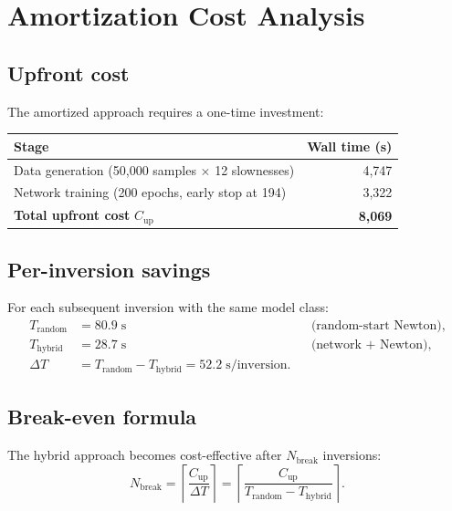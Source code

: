 \documentclass[11pt,a4paper]{article}
\theoremstyle{plain}
\theoremstyle{remark}
\begin{document}
\section{Amortization Cost Analysis}\label{sec:cost}

\subsection{Upfront cost}

The amortized approach requires a one-time investment:

\begin{center}
\renewcommand{\arraystretch}{1.3}
\begin{tabular}{lr}
  \toprule
  \textbf{Stage} & \textbf{Wall time (s)} \\
  \midrule
  Data generation (50{,}000 samples $\times$ 12 slownesses) & 4{,}747 \\
  Network training (200 epochs, early stop at 194) & 3{,}322 \\
  \midrule
  \textbf{Total upfront cost} $C_{\text{up}}$ & \textbf{8{,}069} \\
  \bottomrule
\end{tabular}
\end{center}

\subsection{Per-inversion savings}

For each subsequent inversion with the same model class:
\begin{align}
  T_{\text{random}} &= 80.9\;\text{s} && \text{(random-start Newton)},
  \label{eq:t-random}\\
  T_{\text{hybrid}} &= 28.7\;\text{s} && \text{(network + Newton)},
  \label{eq:t-hybrid}\\
  \Delta T &= T_{\text{random}} - T_{\text{hybrid}}
            = 52.2\;\text{s/inversion}. \label{eq:delta-t}
\end{align}

\subsection{Break-even formula}

The hybrid approach becomes cost-effective after $N_{\text{break}}$
inversions:
\begin{equation}\label{eq:breakeven}
  \boxed{
  N_{\text{break}}
  = \left\lceil \frac{C_{\text{up}}}{\Delta T} \right\rceil
  = \left\lceil \frac{C_{\text{up}}}{T_{\text{random}} - T_{\text{hybrid}}}
    \right\rceil.
  }
\end{equation}
\end{document}
